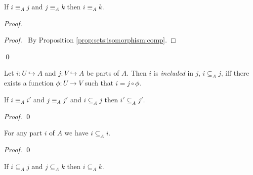 \begin{prop}
  If $i \equiv_A j$ and $j \equiv_A k$ then $i \equiv_A k$.
\end{prop}

\begin{proof}
  \pf
  \begin{proof}
    \pf\ By Proposition \ref{prop:sets:isomorphism:comp}.
  \end{proof}
\qed
\end{proof}

\begin{df}[Inclusion]
 Let $i : U \hookrightarrow A$ and $j : V \hookrightarrow A$ be parts of $A$.
 Then $i$ is \emph{included} in $j$, $i \subseteq_A j$, iff there exists a
 function $\phi : U \rightarrow V$ such that $i = j \circ \phi$.
\end{df}

\begin{prop}
  If $i \equiv_A i'$ and $j \equiv_A j'$ and $i \subseteq_A j$ then $i' \subseteq_A j'$.
\end{prop}

\begin{proof}
  \pf
  \qed
\end{proof}

\begin{prop}
  For any part $i$ of $A$ we have $i \subseteq_A i$.
\end{prop}

\begin{proof}
  \pf
  \qed
\end{proof}

\begin{prop}
  If $i \subseteq_A j$ and $j \subseteq_A k$ then $i \subseteq_A k$.
\end{prop}


